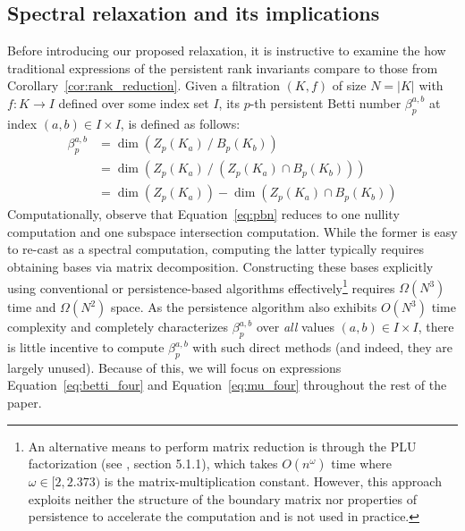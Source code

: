 \documentclass[pdflatex,sn-mathphys-num]{sn-jnl}
\begin{document}
\subsection{Spectral relaxation and its implications}\label{sec:spectral_sec}

Before introducing our proposed relaxation, it is instructive to examine the how traditional expressions of the persistent rank invariants compare to those from Corollary~\ref{cor:rank_reduction}. Given a filtration \((K,f)\) of size \(N = |K|\) with \(f:K \rightarrow I\) defined over some index set \(I\), its \(p\)-th persistent Betti number \(\beta_{p}^{a,b}\) at index \((a,b) \in I \times I\), is defined as follows:
\begin{align*}
\beta_{p}^{a,b} & = \dim(Z_{p}\left( K_{a} \right)\:/\: B_{p}\left( K_{b} \right)) \\
 & = \dim(Z_{p}\left( K_{a} \right)\:/\:\left( Z_{p}\left( K_{a} \right) \cap B_{p}\left( K_{b} \right) \right)) \\
 & = \dim(Z_{p}\left( K_{a} \right)) - \dim(Z_{p}\left( K_{a} \right) \cap B_{p}\left( K_{b} \right))
\end{align*}\label{eq:pbn}
\noindent
Computationally, observe that Equation~\ref{eq:pbn} reduces to one nullity computation and one subspace intersection computation. While the former is easy to re-cast as a spectral computation, computing the latter typically requires obtaining bases via matrix decomposition. Constructing these bases explicitly using conventional \cite{bhatia2013matrix} or persistence-based \cite{zomorodian2004computing, memoli2022persistent} algorithms effectively\footnote{An alternative means to perform matrix reduction is through the PLU factorization (see \cite{dey2022computational}, section 5.1.1), which takes \(O\left( n^{\omega} \right)\) time where \(\omega \in [ 2,2.373)\) is the matrix-multiplication constant. However, this approach exploits neither the structure of the boundary matrix nor properties of persistence to accelerate the computation and is not used in practice.} requires \(\Omega \left( N^{3} \right) \) time and \(\Omega \left( N^{2} \right) \) space. As the persistence algorithm also exhibits \(O \left( N^{3} \right) \) time complexity and completely characterizes \(\beta_{p}^{a,b}\) over \emph{all} values \((a,b) \in I \times I\), there is little incentive to compute \(\beta_{p}^{a,b}\) with such direct methods (and indeed, they are largely unused). Because of this, we will focus on expressions Equation~\ref{eq:betti_four} and Equation~\ref{eq:mu_four} throughout the rest of the paper.
\end{document}
